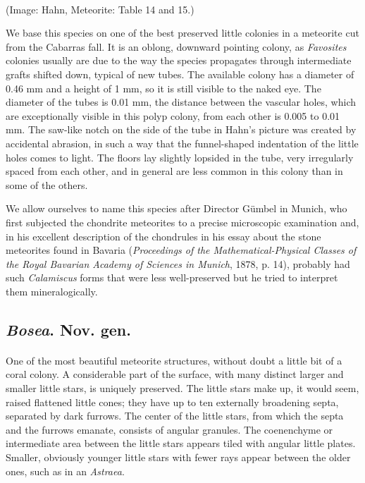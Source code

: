 \documentclass[a4paper, 12pt, oneside]{article}
\begin{document}
\paragraph{}
(Image: Hahn, Meteorite: Table 14 and 15.)

We base this species on one of the best preserved little colonies in a meteorite cut from the Cabarras fall. It is an oblong, downward pointing colony, as \emph{Favosites} colonies usually are due to the way the species propagates through intermediate grafts shifted down, typical of new tubes. The available colony has a diameter of 0.46 mm and a height of 1 mm, so it is still visible to the naked eye. The diameter of the tubes is 0.01 mm, the distance between the vascular holes, which are exceptionally visible in this polyp colony, from each other is 0.005 to 0.01 mm. The saw-like notch on the side of the tube in Hahn's picture was created by accidental abrasion, in such a way that the funnel-shaped indentation of the little holes comes to light. The floors lay slightly lopsided in the tube, very irregularly spaced from each other, and in general are less common in this colony than in some of the others.

We allow ourselves to name this species after Director Gümbel in Munich, who first subjected the chondrite meteorites to a precise microscopic examination and, in his excellent description of the chondrules in his essay about the stone meteorites found in Bavaria (\emph{Proceedings of the Mathematical-Physical Classes of the Royal Bavarian Academy of Sciences in Munich}, 1878, p. 14), probably had such \emph{Calamiscus} forms that were less well-preserved but he tried to interpret them mineralogically.
\subsection{\emph{Bosea}. Nov. gen.}
\paragraph{}
One of the most beautiful meteorite structures, without doubt a little bit of a coral colony. A considerable part of the surface, with many distinct larger and smaller little stars, is uniquely preserved. The little stars make up, it would seem, raised flattened little cones; they have up to ten externally broadening septa, separated by dark furrows. The center of the little stars, from which the septa and the furrows emanate, consists of angular granules. The coenenchyme or intermediate area between the little stars appears tiled with angular little plates. Smaller, obviously younger little stars with fewer rays appear between the older ones, such as in an \emph{Astraea}.
\end{document}
